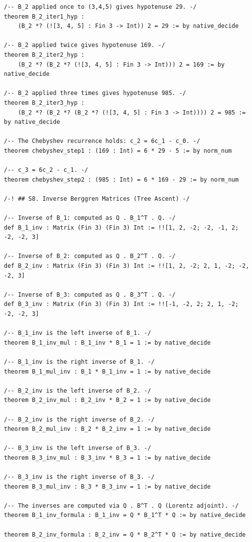\documentclass[11pt,openright,twoside]{book}
\theoremstyle{definition}
\begin{document}
\begin{lstlisting}[style=lean]
/-- B_2 applied once to (3,4,5) gives hypotenuse 29. -/
theorem B_2_iter1_hyp :
    (B_2 *? (![3, 4, 5] : Fin 3 -> Int)) 2 = 29 := by native_decide

/-- B_2 applied twice gives hypotenuse 169. -/
theorem B_2_iter2_hyp :
    (B_2 *? (B_2 *? (![3, 4, 5] : Fin 3 -> Int))) 2 = 169 := by native_decide

/-- B_2 applied three times gives hypotenuse 985. -/
theorem B_2_iter3_hyp :
    (B_2 *? (B_2 *? (B_2 *? (![3, 4, 5] : Fin 3 -> Int)))) 2 = 985 := by native_decide

/-- The Chebyshev recurrence holds: c_2 = 6c_1 - c_0. -/
theorem chebyshev_step1 : (169 : Int) = 6 * 29 - 5 := by norm_num

/-- c_3 = 6c_2 - c_1. -/
theorem chebyshev_step2 : (985 : Int) = 6 * 169 - 29 := by norm_num

/-! ## S8. Inverse Berggren Matrices (Tree Ascent) -/

/-- Inverse of B_1: computed as Q . B_1^T . Q. -/
def B_1_inv : Matrix (Fin 3) (Fin 3) Int := !![1, 2, -2; -2, -1, 2; -2, -2, 3]

/-- Inverse of B_2: computed as Q . B_2^T . Q. -/
def B_2_inv : Matrix (Fin 3) (Fin 3) Int := !![1, 2, -2; 2, 1, -2; -2, -2, 3]

/-- Inverse of B_3: computed as Q . B_3^T . Q. -/
def B_3_inv : Matrix (Fin 3) (Fin 3) Int := !![-1, -2, 2; 2, 1, -2; -2, -2, 3]

/-- B_1_inv is the left inverse of B_1. -/
theorem B_1_inv_mul : B_1_inv * B_1 = 1 := by native_decide

/-- B_1_inv is the right inverse of B_1. -/
theorem B_1_mul_inv : B_1 * B_1_inv = 1 := by native_decide

/-- B_2_inv is the left inverse of B_2. -/
theorem B_2_inv_mul : B_2_inv * B_2 = 1 := by native_decide

/-- B_2_inv is the right inverse of B_2. -/
theorem B_2_mul_inv : B_2 * B_2_inv = 1 := by native_decide

/-- B_3_inv is the left inverse of B_3. -/
theorem B_3_inv_mul : B_3_inv * B_3 = 1 := by native_decide

/-- B_3_inv is the right inverse of B_3. -/
theorem B_3_mul_inv : B_3 * B_3_inv = 1 := by native_decide

/-- The inverses are computed via Q . B^T . Q (Lorentz adjoint). -/
theorem B_1_inv_formula : B_1_inv = Q * B_1^T * Q := by native_decide

theorem B_2_inv_formula : B_2_inv = Q * B_2^T * Q := by native_decide


\end{lstlisting}
\end{document}
